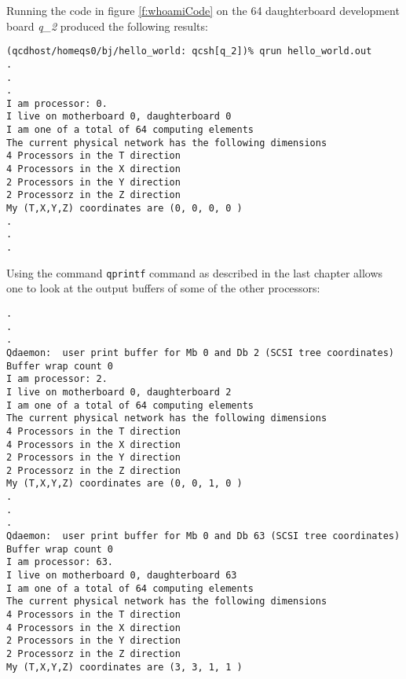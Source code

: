Running the code in figure \ref{f:whoamiCode} on the 64 daughterboard 
development board {\em q\_2} produced the following results:
{
\scriptsize
\begin{verbatim}
(qcdhost/homeqs0/bj/hello_world: qcsh[q_2])% qrun hello_world.out
.
.
.
I am processor: 0.
I live on motherboard 0, daughterboard 0
I am one of a total of 64 computing elements
The current physical network has the following dimensions
4 Processors in the T direction
4 Processors in the X direction
2 Processors in the Y direction
2 Processorz in the Z direction
My (T,X,Y,Z) coordinates are (0, 0, 0, 0 )
.
.
.
\end{verbatim}
}

Using the command {\tt qprintf} command as described in the last chapter
allows one to look at the output buffers of some of the other processors:
{\scriptsize
\begin{verbatim}
.
.
.
Qdaemon:  user print buffer for Mb 0 and Db 2 (SCSI tree coordinates)
Buffer wrap count 0
I am processor: 2.
I live on motherboard 0, daughterboard 2
I am one of a total of 64 computing elements
The current physical network has the following dimensions
4 Processors in the T direction
4 Processors in the X direction
2 Processors in the Y direction
2 Processorz in the Z direction
My (T,X,Y,Z) coordinates are (0, 0, 1, 0 )
.
.
.
Qdaemon:  user print buffer for Mb 0 and Db 63 (SCSI tree coordinates)
Buffer wrap count 0
I am processor: 63.
I live on motherboard 0, daughterboard 63
I am one of a total of 64 computing elements
The current physical network has the following dimensions
4 Processors in the T direction
4 Processors in the X direction
2 Processors in the Y direction
2 Processorz in the Z direction
My (T,X,Y,Z) coordinates are (3, 3, 1, 1 )
\end{verbatim}
}

